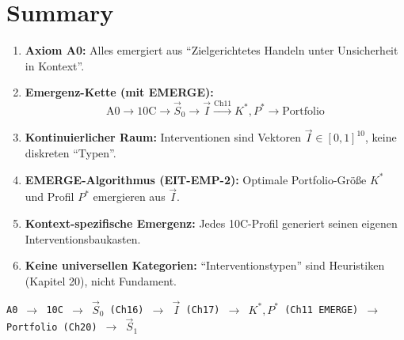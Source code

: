 
\section{Summary}
\label{sec:17-summary}

\begin{tcolorbox}[colback=green!5!white, colframe=green!75!black,
    title=Key Points]

\begin{enumerate}
\item \textbf{Axiom A0:} Alles emergiert aus ``Zielgerichtetes Handeln unter Unsicherheit in Kontext''.

\item \textbf{Emergenz-Kette (mit EMERGE):}
\begin{equation}
\text{A0} \rightarrow \text{10C} \rightarrow \vec{S}_0 \rightarrow \vec{I} \xrightarrow{\text{Ch11}} K^*, P^* \rightarrow \text{Portfolio}
\end{equation}

\item \textbf{Kontinuierlicher Raum:} Interventionen sind Vektoren $\vec{I} \in [0,1]^{10}$, keine diskreten ``Typen''.

\item \textbf{EMERGE-Algorithmus (EIT-EMP-2):} Optimale Portfolio-Größe $K^*$ und Profil $P^*$ emergieren aus $\vec{I}$.

\item \textbf{Kontext-spezifische Emergenz:} Jedes 10C-Profil generiert seinen eigenen Interventionsbaukasten.

\item \textbf{Keine universellen Kategorien:} ``Interventionstypen'' sind Heuristiken (Kapitel 20), nicht Fundament.
\end{enumerate}

\end{tcolorbox}

\begin{tcolorbox}[colback=blue!5!white, colframe=blue!75!black,
    title=Die emergente Interventionstheorie auf einen Blick]

\begin{center}
\small
\texttt{A0 $\rightarrow$ 10C $\rightarrow$ $\vec{S}_0$ (Ch16) $\rightarrow$ $\vec{I}$ (Ch17) $\rightarrow$ $K^*, P^*$ (Ch11 EMERGE) $\rightarrow$ Portfolio (Ch20) $\rightarrow$ $\vec{S}_1$}
\end{center}

\end{tcolorbox}

